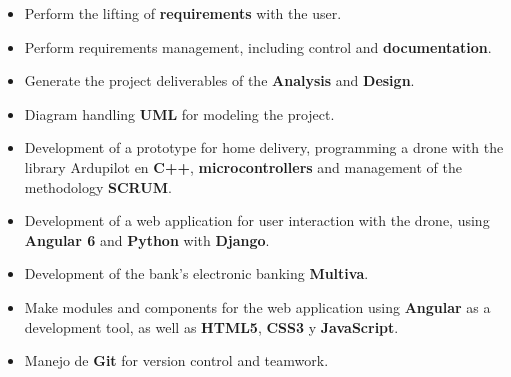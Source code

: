 \documentclass[letterpaper]{twentysecondcv} %
\begin{document}
\divider

\begin{itemize}
	\item Perform the lifting of \textbf{requirements} with the user.
	\item Perform requirements management, including control and \textbf{documentation}.
	\item Generate the project deliverables of the \textbf{Analysis} and  \textbf{Design}.
	\item Diagram handling  \textbf{UML} for modeling the project.
\end{itemize}

\divider

\begin{itemize}
	\item Development of a prototype for home delivery, programming a drone with the library  Ardupilot en \textbf{C++}, \textbf{microcontrollers} and management of the methodology \textbf{SCRUM}.
	\item Development of a web application for user interaction with the drone, using  \textbf{Angular 6} and  \textbf{Python} with  \textbf{Django}.
\end{itemize}

\divider

\begin{itemize}
	\item Development of the bank's electronic banking \textbf{Multiva}.
	\item Make modules and components for the web application using \textbf{Angular} as a development tool, as well as \textbf{HTML5}, \textbf{CSS3} y \textbf{JavaScript}.
	\item Manejo de \textbf{Git} for version control and teamwork.
\end{itemize}


\end{document}
